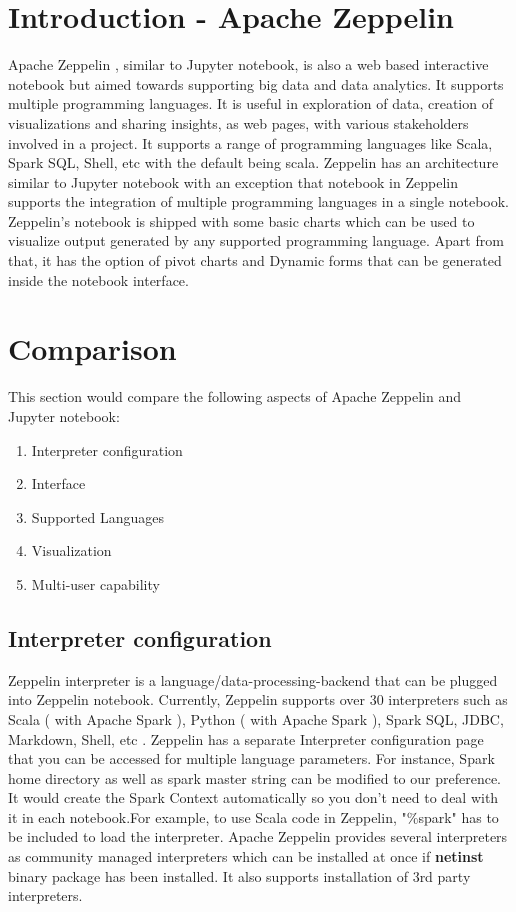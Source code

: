 \documentclass[9pt,twocolumn,twoside]{../../styles/osajnl}
\begin{document}
\section{Introduction - Apache Zeppelin}

Apache Zeppelin \cite{www-zeppelin}, similar to Jupyter notebook, is also a web based interactive notebook but aimed towards supporting big data and data analytics. It supports multiple programming languages. It is useful in exploration of data, creation of visualizations and sharing insights, as web pages, with various stakeholders involved in a project. It supports a range of programming languages like Scala, Spark SQL, Shell, etc with the default being scala. Zeppelin has an architecture similar to Jupyter notebook with an exception that notebook in Zeppelin supports the integration of multiple programming languages in a single notebook. Zeppelin's notebook is shipped with some basic charts which can be used to visualize output generated by any supported programming language. Apart from that, it has the option of pivot charts and Dynamic forms that can be generated inside the notebook interface. 

\section{Comparison}

This section would compare the following aspects of Apache Zeppelin and Jupyter notebook:
\begin{enumerate}
    \item Interpreter configuration
    \item Interface
    \item Supported Languages
    \item Visualization
    \item Multi-user capability
\end{enumerate}

\subsection{Interpreter configuration}

Zeppelin interpreter is a language/data-processing-backend that can be plugged into Zeppelin notebook. Currently, Zeppelin supports over 30 interpreters such as Scala ( with Apache Spark ), Python ( with Apache Spark ), Spark SQL, JDBC, Markdown, Shell, etc \cite{www-zeppelin-int}. Zeppelin has a separate Interpreter configuration page that you can be accessed for multiple language parameters. For instance, Spark home directory as well as spark master string can be modified to our preference. It would create the Spark Context automatically so you don't need to deal with it in each notebook.For example, to use Scala code in Zeppelin, "\%spark" has to be included to load the interpreter. Apache Zeppelin provides several interpreters as community managed interpreters \cite{www-zeppelin-int-install} which can be installed at once if \textbf{netinst} binary package has been installed. It also supports installation of 3rd party interpreters.\\
\end{document}
